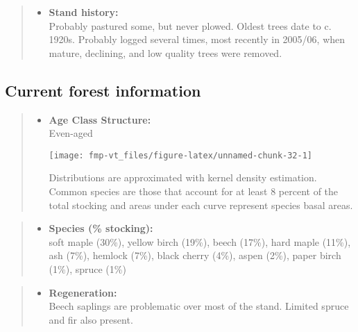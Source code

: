 \documentclass[]{tufte-handout}
\providecommand{\tightlist}{%
  \setlength{\itemsep}{0pt}\setlength{\parskip}{0pt}}
\begin{document}
\begin{quote}
\begin{itemize}
\tightlist
\item
  \textbf{Stand history:}\\
  \vspace{2pt} Probably pastured some, but never plowed. Oldest trees
  date to c. 1920s. Probably logged several times, most recently in
  2005/06, when mature, declining, and low quality trees were removed.
\end{itemize}
\end{quote}

\subsection{Current forest
information}\label{current-forest-information-5}

\begin{quote}
\begin{itemize}
\tightlist
\item
  \textbf{Age Class Structure:}\\
  \vspace{2pt} Even-aged\\

  \begin{marginfigure}
  \texttt{[image: fmp-vt\_files/figure-latex/unnamed-chunk-32-1]} \caption[Distributions are approximated with kernel density estimation]{Distributions are approximated with kernel density estimation. Common species are those that account for at least 8 percent of the total stocking and areas under each curve represent species basal areas.}\label{fig:unnamed-chunk-32}
  \end{marginfigure}
\end{itemize}
\end{quote}

\begin{quote}
\begin{itemize}
\tightlist
\item
  \textbf{Species (\% stocking):}\\
  \vspace{2pt} soft maple (30\%), yellow birch (19\%), beech (17\%),
  hard maple (11\%), ash (7\%), hemlock (7\%), black cherry (4\%), aspen
  (2\%), paper birch (1\%), spruce (1\%)
\end{itemize}
\end{quote}

\begin{quote}
\begin{itemize}
\tightlist
\item
  \textbf{Regeneration:}\\
  \vspace{2pt} Beech saplings are problematic over most of the stand.
  Limited spruce and fir also present.
\end{itemize}
\end{quote}
\end{document}
